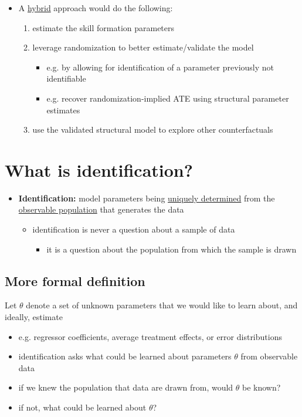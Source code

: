 \documentclass[11pt]{article}
\begin{document}
\begin{itemize}
\item A \uline{hybrid} approach would do the following:

\begin{enumerate}
\item estimate the skill formation parameters
\item leverage randomization to better estimate/validate the model
\begin{itemize}
\item e.g. by allowing for identification of a parameter previously not identifiable
\item e.g. recover randomization-implied ATE using structural parameter estimates
\end{itemize}
\item use the validated structural model to explore other counterfactuals
\end{enumerate}
\end{itemize}

\section{What is identification? \cite{lewbel2019zoo}}
\label{sec:org81841e2}

\begin{itemize}
\item \textbf{Identification:} model parameters being \uline{uniquely determined} from the \uline{observable population} that generates the data
\begin{itemize}
\item identification is never a question about a sample of data
\begin{itemize}
\item it is a question about the population from which the sample is drawn
\end{itemize}
\end{itemize}
\end{itemize}

\subsection{More formal definition}
\label{sec:org52206bc}


Let \(\theta\) denote a set of unknown parameters that we would like to learn about, and ideally, estimate

\begin{itemize}
\item e.g. regressor coefficients, average treatment effects, or error distributions
\item identification asks what could be learned about parameters \(\theta\) from observable data
\item if we knew the population that data are drawn from, would \(\theta\) be known?
\item if not, what could be learned about \(\theta\)?
\end{itemize}
\end{document}
